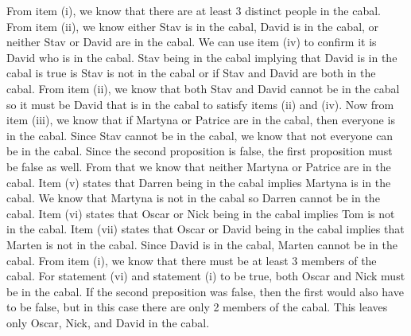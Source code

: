 \documentclass[11pt,fleqn]{article}
\begin{document}
From item (i), we know that there are at least 3 distinct people in the cabal. From item (ii), we know either Stav is in the cabal, David is in the cabal, or neither Stav or David are in the cabal. We can use item (iv) to confirm it is David who is in the cabal. Stav being in the cabal implying that David is in the cabal is true is Stav is not in the cabal or if Stav and David are both in the cabal. From item (ii), we know that both Stav and David cannot be in the cabal so it must be David that is in the cabal to satisfy items (ii) and (iv). Now from item (iii), we know that if Martyna or Patrice are in the cabal, then everyone is in the cabal. Since Stav cannot be in the cabal, we know that not everyone can be in the cabal. Since the second proposition is false, the first proposition must be false as well. From that we know that neither Martyna or Patrice are in the cabal. Item (v) states that Darren being in the cabal implies Martyna is in the cabal. We know that Martyna is not in the cabal so Darren cannot be in the cabal. Item (vi) states that Oscar or Nick being in the cabal implies Tom is not in the cabal. Item (vii) states that Oscar or David being in the cabal implies that Marten is not in the cabal. Since David is in the cabal, Marten cannot be in the cabal. From item (i), we know that there must be at least 3 members of the cabal. For statement (vi) and statement (i) to be true, both Oscar and Nick must be in the cabal. If the second preposition was false, then the first would also have to be false, but in this case there are only 2 members of the cabal. This leaves only Oscar, Nick, and David in the cabal.
\end{document}
